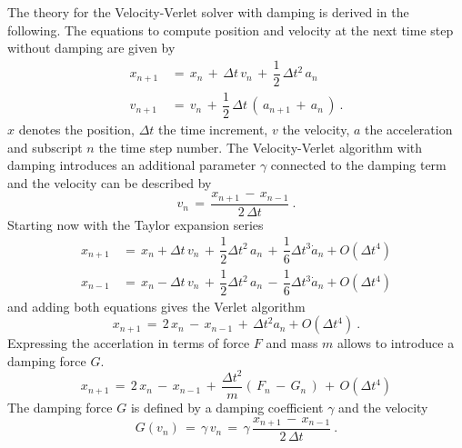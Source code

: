   The theory for the Velocity-Verlet solver with damping is derived in the following. The equations to compute position and velocity at 
  the next time step without damping are given by
  \begin{equation}
  \begin{aligned}
   x_{n+1} \, &= \, x_n \, + \, \Delta t \, v_n \, + \, \dfrac{1}{2} \, \Delta t^2 \, a_n \\
   v_{n+1} \, &= \, v_n \, + \, \dfrac{1}{2} \, \Delta t \, (\, a_{n+1} \, + \, a_n \, ) ~.
  \end{aligned}
  \end{equation}
  $x$ denotes the position, $\Delta t$ the time increment, $v$ the velocity, $a$ the acceleration and subscript $n$ the time step number.
  The Velocity-Verlet algorithm with damping introduces an additional parameter $\gamma$ connected to the damping term and the velocity can be described by
  \begin{equation}
   v_{n} \, = \, \dfrac{x_{n+1} \, - \, x_{n-1}}{2 \, \Delta t} ~.
  \label{velointerpolation}
  \end{equation}
  Starting now with the Taylor expansion series
  \begin{equation}
  \begin{aligned}
   x_{n+1} \, &= \, x_n + \Delta t \, v_n \, + \, \dfrac{1}{2} \Delta t^2 \, a_n \, + \, \dfrac{1}{6} \Delta t^3 \dot{a}_n + O(\Delta t^4 ) \\
   x_{n-1} \, &= \, x_n - \Delta t \, v_n \, + \, \dfrac{1}{2} \Delta t^2 \, a_n \, - \, \dfrac{1}{6} \Delta t^3 \dot{a}_n + O(\Delta t^4 ) 
  \end{aligned}
  \end{equation}
  and adding both equations gives the Verlet algorithm
  \begin{equation}
   x_{n+1} \, = \, 2 \, x_n \, - \, x_{n-1} \, + \, \Delta t^2 a_n + O(\Delta t^4 ) ~.
  \end{equation}
  Expressing the accerlation in terms of force $F$ and mass $m$ allows to introduce a damping force $G$.
  \begin{equation}
   x_{n+1} \, = \, 2 \, x_n \, - \, x_{n-1} \, + \, \dfrac{\Delta t^2}{m} (\, F_n \, - \, G_n \, ) \, + \, O(\Delta t^4 )
  \label{verlet1}
  \end{equation}
  The damping force $G$ is defined by a damping coefficient $\gamma$ and the velocity
  \begin{equation}
   G(v_n) \, = \, \gamma \, v_n \, = \, \gamma \, \dfrac{x_{n+1} \, - \, x_{n-1}}{2 \, \Delta t} ~.
  \end{equation}
